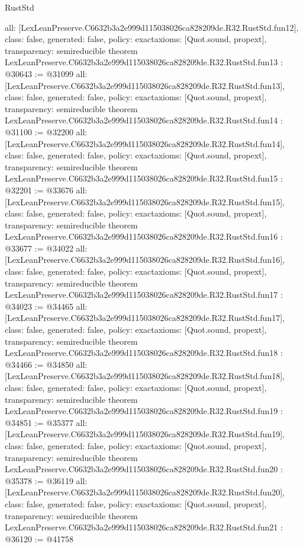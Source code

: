 \begin{lexlean}{RustStd}
\begin{coremodule}
{  all: [LexLeanPreserve.C6632b3a2e999d115038026ca828209de.R32.RustStd.fun12],
  class: false,
  generated: false,
  policy: exact{axioms: [Quot.sound, propext]},
  transparency: semireducible
}
theorem LexLeanPreserve.C6632b3a2e999d115038026ca828209de.R32.RustStd.fun13 : @30643 := @31099 {
  all: [LexLeanPreserve.C6632b3a2e999d115038026ca828209de.R32.RustStd.fun13],
  class: false,
  generated: false,
  policy: exact{axioms: [Quot.sound, propext]},
  transparency: semireducible
}
theorem LexLeanPreserve.C6632b3a2e999d115038026ca828209de.R32.RustStd.fun14 : @31100 := @32200 {
  all: [LexLeanPreserve.C6632b3a2e999d115038026ca828209de.R32.RustStd.fun14],
  class: false,
  generated: false,
  policy: exact{axioms: [Quot.sound, propext]},
  transparency: semireducible
}
theorem LexLeanPreserve.C6632b3a2e999d115038026ca828209de.R32.RustStd.fun15 : @32201 := @33676 {
  all: [LexLeanPreserve.C6632b3a2e999d115038026ca828209de.R32.RustStd.fun15],
  class: false,
  generated: false,
  policy: exact{axioms: [Quot.sound, propext]},
  transparency: semireducible
}
theorem LexLeanPreserve.C6632b3a2e999d115038026ca828209de.R32.RustStd.fun16 : @33677 := @34022 {
  all: [LexLeanPreserve.C6632b3a2e999d115038026ca828209de.R32.RustStd.fun16],
  class: false,
  generated: false,
  policy: exact{axioms: [Quot.sound, propext]},
  transparency: semireducible
}
theorem LexLeanPreserve.C6632b3a2e999d115038026ca828209de.R32.RustStd.fun17 : @34023 := @34465 {
  all: [LexLeanPreserve.C6632b3a2e999d115038026ca828209de.R32.RustStd.fun17],
  class: false,
  generated: false,
  policy: exact{axioms: [Quot.sound, propext]},
  transparency: semireducible
}
theorem LexLeanPreserve.C6632b3a2e999d115038026ca828209de.R32.RustStd.fun18 : @34466 := @34850 {
  all: [LexLeanPreserve.C6632b3a2e999d115038026ca828209de.R32.RustStd.fun18],
  class: false,
  generated: false,
  policy: exact{axioms: [Quot.sound, propext]},
  transparency: semireducible
}
theorem LexLeanPreserve.C6632b3a2e999d115038026ca828209de.R32.RustStd.fun19 : @34851 := @35377 {
  all: [LexLeanPreserve.C6632b3a2e999d115038026ca828209de.R32.RustStd.fun19],
  class: false,
  generated: false,
  policy: exact{axioms: [Quot.sound, propext]},
  transparency: semireducible
}
theorem LexLeanPreserve.C6632b3a2e999d115038026ca828209de.R32.RustStd.fun20 : @35378 := @36119 {
  all: [LexLeanPreserve.C6632b3a2e999d115038026ca828209de.R32.RustStd.fun20],
  class: false,
  generated: false,
  policy: exact{axioms: [Quot.sound, propext]},
  transparency: semireducible
}
theorem LexLeanPreserve.C6632b3a2e999d115038026ca828209de.R32.RustStd.fun21 : @36120 := @41758 {
}
\end{coremodule}
\end{lexlean}
